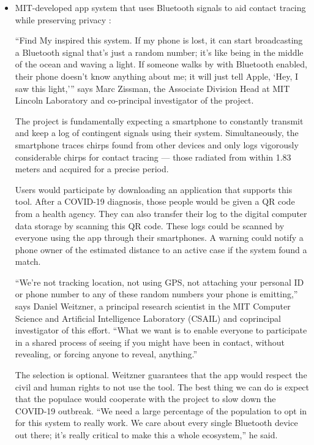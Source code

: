 \begin{itemize}
\begin{itemize}
          \item MIT-developed app system that uses Bluetooth signals to aid contact tracing while preserving privacy \parencite{MIT_App}:
          \par “Find My \parencite{AppleFindMy} inspired this system. If my phone is lost, it can start broadcasting a Bluetooth signal that’s just a random number; it’s like being in the middle of the ocean and waving a light. If someone walks by with Bluetooth enabled, their phone doesn’t know anything about me; it will just tell Apple, ‘Hey, I saw this light,’” says Marc Zissman, the Associate Division Head at MIT Lincoln Laboratory and co-principal investigator of the project.
          \par The project is fundamentally expecting a smartphone to constantly transmit and keep a log of contingent signals using their system. Simultaneously, the smartphone traces chirps found from other devices and only logs vigorously considerable chirps for contact tracing — those radiated from within 1.83 meters and acquired for a precise period.
          \par Users would participate by downloading an application that supports this tool. After a COVID-19 diagnosis, those people would be given a QR code from a health agency. They can also transfer their log to the digital computer data storage by scanning this QR code. These logs could be scanned by everyone using the app through their smartphones. A warning could notify a phone owner of the estimated distance to an active case if the system found a match.
          \par “We’re not tracking location, not using GPS, not attaching your personal ID or phone number to any of these random numbers your phone is emitting,” says Daniel Weitzner, a principal research scientist in the MIT Computer Science and Artificial Intelligence Laboratory (CSAIL) and coprincipal investigator of this effort. “What we want is to enable everyone to participate in a shared process of seeing if you might have been in contact, without revealing, or forcing anyone to reveal, anything.”
          \par The selection is optional. Weitzner guarantees that the app would respect the civil and human rights to not use the tool. The best thing we can do is expect that the populace would cooperate with the project to slow down the COVID-19 outbreak. “We need a large percentage of the population to opt in for this system to really work. We care about every single Bluetooth device out there; it’s really critical to make this a whole ecosystem,” he said.  
        \end{itemize}


\end{itemize}
